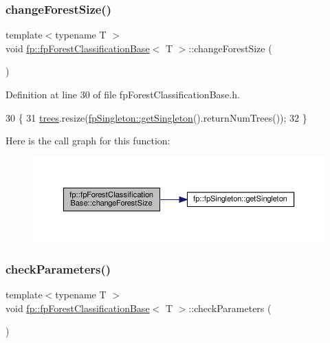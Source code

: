 \subsubsection{\texorpdfstring{change\+Forest\+Size()}{changeForestSize()}}
{\footnotesize\ttfamily template$<$typename T $>$ \\
void \hyperlink{classfp_1_1fpForestClassificationBase}{fp\+::fp\+Forest\+Classification\+Base}$<$ T $>$\+::change\+Forest\+Size (\begin{DoxyParamCaption}{ }\end{DoxyParamCaption})\hspace{0.3cm}{\ttfamily [inline]}}



Definition at line 30 of file fp\+Forest\+Classification\+Base.\+h.


\begin{DoxyCode}
30                                    \{
31                 \hyperlink{classfp_1_1fpForestClassificationBase_a51482a6c95c4b3cb42627f029c2d4662}{trees}.resize(\hyperlink{classfp_1_1fpSingleton_a8bdae77b68521003e3fc630edec2e240}{fpSingleton::getSingleton}().returnNumTrees());
32             \}
\end{DoxyCode}
Here is the call graph for this function\+:\nopagebreak
\begin{figure}[H]
\begin{center}
\leavevmode
\includegraphics[width=350pt]{classfp_1_1fpForestClassificationBase_a696b361df0a1c9aa36687333e2d8111b_cgraph}
\end{center}
\end{figure}
\mbox{\label{classfp_1_1fpForestClassificationBase_a3186e3b6471f82df3f69172f67aa7d19}} 
\subsubsection{\texorpdfstring{check\+Parameters()}{checkParameters()}}
{\footnotesize\ttfamily template$<$typename T $>$ \\
void \hyperlink{classfp_1_1fpForestClassificationBase}{fp\+::fp\+Forest\+Classification\+Base}$<$ T $>$\+::check\+Parameters (\begin{DoxyParamCaption}{ }\end{DoxyParamCaption})\hspace{0.3cm}{\ttfamily [inline]}}




